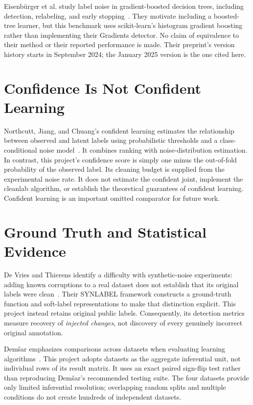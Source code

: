 Eisenb{\"u}rger et al. study label noise in gradient-boosted decision trees,
including detection, relabeling, and early stopping~\cite{eisenburger2025}.
They motivate including a boosted-tree learner, but this benchmark uses
scikit-learn's histogram gradient boosting rather than implementing their
Gradients detector. No claim of equivalence to their method or their reported
performance is made. Their preprint's version history starts in September
2024; the January 2025 version is the one cited here.

\section{Confidence Is Not Confident Learning}
Northcutt, Jiang, and Chuang's confident learning estimates the relationship
between observed and latent labels using probabilistic thresholds and a
class-conditional noise model~\cite{northcutt2021}. It combines ranking with
noise-distribution estimation. In contrast, this project's confidence score
is simply one minus the out-of-fold probability of the observed label.
Its cleaning budget is supplied from the experimental noise rate. It does
not estimate the confident joint, implement the cleanlab algorithm, or establish
the theoretical guarantees of confident learning. Confident learning is an
important omitted comparator for future work.

\section{Ground Truth and Statistical Evidence}
De Vries and Thierens identify a difficulty with synthetic-noise experiments:
adding known corruptions to a real dataset does not establish that its original
labels were clean~\cite{devries2025}. Their SYNLABEL framework constructs a
ground-truth function and soft-label representations to make that distinction
explicit. This project instead retains original public labels. Consequently,
its detection metrics measure recovery of \emph{injected changes}, not discovery
of every genuinely incorrect original annotation.

Dem{\v{s}}ar emphasizes comparisons across datasets when evaluating learning
algorithms~\cite{demsar2006}. This project adopts datasets as the aggregate
inferential unit, not individual rows of its result matrix. It uses an exact
paired sign-flip test rather than reproducing Dem{\v{s}}ar's recommended
testing suite. The four datasets provide only limited inferential resolution;
overlapping random splits and multiple conditions do not create hundreds of
independent datasets.

